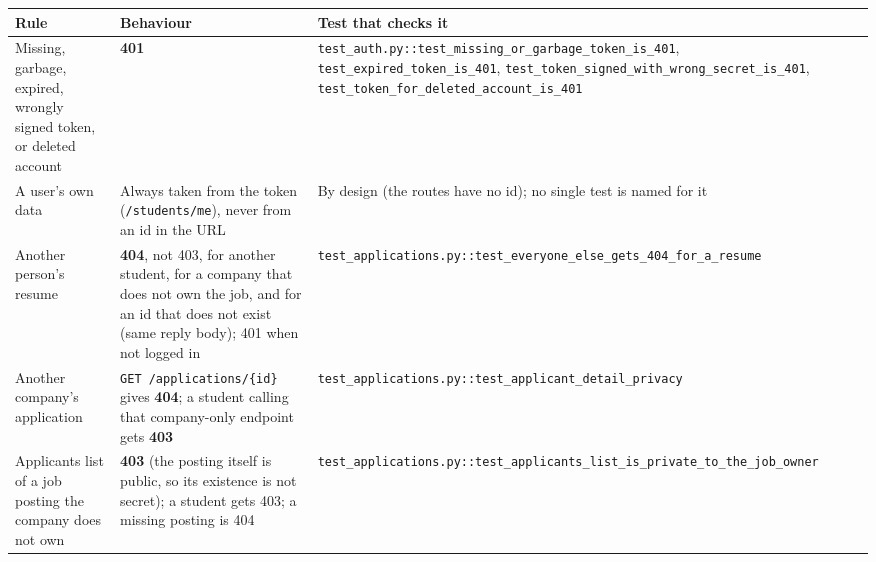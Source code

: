 \documentclass[11pt,letterpaper]{article}
\newcommand{\code}[1]{\texttt{#1}}
\begin{document}
{\small
\begin{longtable}{>{\raggedright\arraybackslash}p{}>{\raggedright\arraybackslash}p{}>{\raggedright\arraybackslash}p{}}
\hline
\textbf{Rule} & \textbf{Behaviour} & \textbf{Test that checks it} \\ \hline
\endhead
Missing, garbage, expired, wrongly signed token, or deleted account & \textbf{401} & \code{test\_\allowbreak{}auth.\allowbreak{}py:\allowbreak{}:\allowbreak{}test\_\allowbreak{}missing\_\allowbreak{}or\_\allowbreak{}garbage\_\allowbreak{}token\_\allowbreak{}is\_\allowbreak{}401}, \code{test\_\allowbreak{}expired\_\allowbreak{}token\_\allowbreak{}is\_\allowbreak{}401}, \code{test\_\allowbreak{}token\_\allowbreak{}signed\_\allowbreak{}with\_\allowbreak{}wrong\_\allowbreak{}secret\_\allowbreak{}is\_\allowbreak{}401}, \code{test\_\allowbreak{}token\_\allowbreak{}for\_\allowbreak{}deleted\_\allowbreak{}account\_\allowbreak{}is\_\allowbreak{}401} \\ \hline
A user's own data & Always taken from the token (\code{/\allowbreak{}students/\allowbreak{}me}), never from an id in the URL & By design (the routes have no id); no single test is named for it \\ \hline
Another person's resume & \textbf{404}, not 403, for another student, for a company that does not own the job, and for an id that does not exist (same reply body); 401 when not logged in & \code{test\_\allowbreak{}applications.\allowbreak{}py:\allowbreak{}:\allowbreak{}test\_\allowbreak{}everyone\_\allowbreak{}else\_\allowbreak{}gets\_\allowbreak{}404\_\allowbreak{}for\_\allowbreak{}a\_\allowbreak{}resume} \\ \hline
Another company's application & \code{GET /\allowbreak{}applications/\allowbreak{}\{id\}} gives \textbf{404}; a student calling that company-only endpoint gets \textbf{403} & \code{test\_\allowbreak{}applications.\allowbreak{}py:\allowbreak{}:\allowbreak{}test\_\allowbreak{}applicant\_\allowbreak{}detail\_\allowbreak{}privacy} \\ \hline
Applicants list of a job posting the company does not own & \textbf{403} (the posting itself is public, so its existence is not secret); a student gets 403; a missing posting is 404 & \code{test\_\allowbreak{}applications.\allowbreak{}py:\allowbreak{}:\allowbreak{}test\_\allowbreak{}applicants\_\allowbreak{}list\_\allowbreak{}is\_\allowbreak{}private\_\allowbreak{}to\_\allowbreak{}the\_\allowbreak{}job\_\allowbreak{}owner} \\ \hline

\end{longtable}}
\end{document}
